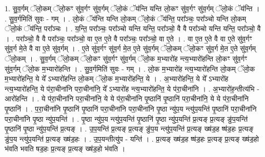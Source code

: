 \documentclass[17pt]{extarticle}
\begin{document}
1. सु॒व॒र्गम् ॅलो॒कम् ॅलो॒कꣳ सु॑व॒र्गꣳ सु॑व॒र्गम् ॅलो॒कं ॅय॑न्ति यन्ति लो॒कꣳ सु॑व॒र्गꣳ सु॑व॒र्गम् ॅलो॒कं ॅय॑न्ति । . सु॒व॒र्गमिति॑ सुवः - गम् । . लो॒कं ॅय॑न्ति यन्ति लो॒कम् ॅलो॒कं ॅय॑न्ति॒ परा᳚ञ्चः॒ परा᳚ञ्चो यन्ति लो॒कम् ॅलो॒कं ॅय॑न्ति॒ परा᳚ञ्चः । . य॒न्ति॒ परा᳚ञ्चः॒ परा᳚ञ्चो यन्ति यन्ति॒ परा᳚ञ्चो॒ वै वै परा᳚ञ्चो यन्ति यन्ति॒ परा᳚ञ्चो॒ वै । . परा᳚ञ्चो॒ वै वै परा᳚ञ्चः॒ परा᳚ञ्चो॒ वा ए॒त ए॒ते वै परा᳚ञ्चः॒ परा᳚ञ्चो॒ वा ए॒ते । . वा ए॒त ए॒ते वै वा ए॒ते सु॑व॒र्गꣳ सु॑व॒र्ग मे॒ते वै वा ए॒ते सु॑व॒र्गम् । . ए॒ते सु॑व॒र्गꣳ सु॑व॒र्ग मे॒त ए॒ते सु॑व॒र्गम् ॅलो॒कम् ॅलो॒कꣳ सु॑व॒र्ग मे॒त ए॒ते सु॑व॒र्गम् ॅलो॒कम् । . सु॒व॒र्गम् ॅलो॒कम् ॅलो॒कꣳ सु॑व॒र्गꣳ सु॑व॒र्गम् ॅलो॒क म॒भ्यारो॑ह न्त्य॒भ्यारो॑हन्ति लो॒कꣳ सु॑व॒र्गꣳ सु॑व॒र्गम् ॅलो॒क म॒भ्यारो॑हन्ति । . सु॒व॒र्गमिति॑ सुवः - गम् । . लो॒क म॒भ्यारो॑ह न्त्य॒भ्यारो॑हन्ति लो॒कम् ॅलो॒क म॒भ्यारो॑हन्ति॒ ये ये᳚ ऽभ्यारो॑हन्ति लो॒कम् ॅलो॒क म॒भ्यारो॑हन्ति॒ ये । . अ॒भ्यारो॑हन्ति॒ ये ये᳚ ऽभ्यारो॑ह न्त्य॒भ्यारो॑हन्ति॒ ये प॑रा॒चीना॑नि परा॒चीना॑नि॒ ये᳚ ऽभ्यारो॑ह न्त्य॒भ्यारो॑हन्ति॒ ये प॑रा॒चीना॑नि । . अ॒भ्यारो॑ह॒न्तीत्य॑भि - आरो॑हन्ति । . ये प॑रा॒चीना॑नि परा॒चीना॑नि॒ ये ये प॑रा॒चीना॑नि पृ॒ष्ठानि॑ पृ॒ष्ठानि॑ परा॒चीना॑नि॒ ये ये प॑रा॒चीना॑नि पृ॒ष्ठानि॑ । . प॒रा॒चीना॑नि पृ॒ष्ठानि॑ पृ॒ष्ठानि॑ परा॒चीना॑नि परा॒चीना॑नि पृ॒ष्ठा न्यु॑प॒य न्त्यु॑प॒यन्ति॑ पृ॒ष्ठानि॑ परा॒चीना॑नि परा॒चीना॑नि पृ॒ष्ठा न्यु॑प॒यन्ति॑ । . पृ॒ष्ठा न्यु॑प॒य न्त्यु॑प॒यन्ति॑ पृ॒ष्ठानि॑ पृ॒ष्ठा न्यु॑प॒यन्ति॑ प्र॒त्यङ् प्र॒त्यङ् ङु॑प॒यन्ति॑ पृ॒ष्ठानि॑ पृ॒ष्ठा न्यु॑प॒यन्ति॑ प्र॒त्यङ् । . उ॒प॒यन्ति॑ प्र॒त्यङ् प्र॒त्यङ् ङु॑प॒य न्त्यु॑प॒यन्ति॑ प्र॒त्यङ् ख्ष॑ड॒ह ष्ष॑ड॒हः प्र॒त्यङ् ङु॑प॒य न्त्यु॑प॒यन्ति॑ प्र॒त्यङ् ख्ष॑ड॒हः । . उ॒प॒यन्तीत्यु॑प - यन्ति॑ । . प्र॒त्यङ् ख्ष॑ड॒ह ष्ष॑ड॒हः प्र॒त्यङ् प्र॒त्यङ् ख्ष॑ड॒हो भ॑वति भवति षड॒हः प्र॒त्यङ् प्र॒त्यङ् ख्ष॑ड॒हो भ॑वति । \newline
\end{document}
